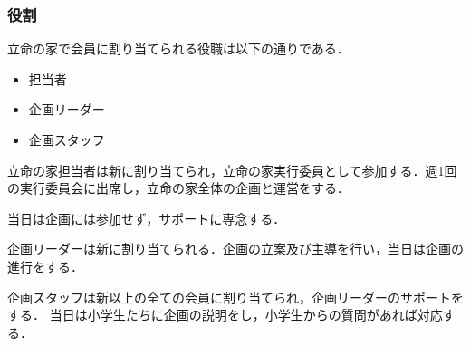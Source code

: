 \subsubsection*{役割}
立命の家で会員に割り当てられる役職は以下の通りである．
\begin{itemize}
  \item 担当者
  \item 企画リーダー
  \item 企画スタッフ
\end{itemize} 

立命の家担当者は新\secondGrade{}に割り当てられ，立命の家実行委員として参加する．週1回の実行委員会に出席し，立命の家全体の企画と運営をする．

当日は企画には参加せず，サポートに専念する．

企画リーダーは新\secondGrade{}に割り当てられる．企画の立案及び主導を行い，当日は企画の進行をする．

企画スタッフは新\firstGrade{}以上の全ての会員に割り当てられ，企画リーダーのサポートをする．
当日は小学生たちに企画の説明をし，小学生からの質問があれば対応する．
